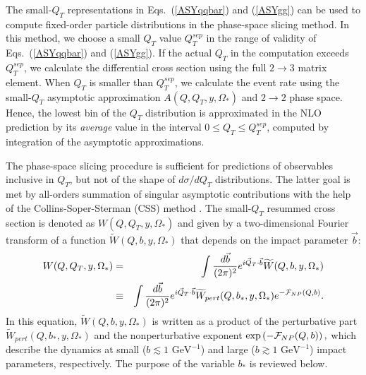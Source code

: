 \documentclass[12pt,english,aps,preprint,prd,letterpaper,fleqn,nofootinbib,showpacs,showkeys,tightenlines,floatfix]{revtex4}
\begin{document}
The small-$Q_{T}$ representations in Eqs.~(\ref{ASYqqbar}) and
(\ref{ASYgg}) can be used to compute fixed-order particle distributions
in the phase-space slicing method. In this method, we choose a small
$Q_{T}$ value $Q_{T}^{sep}$ in the range of validity of 
Eqs.~(\ref{ASYqqbar}) and (\ref{ASYgg}). If the
actual $Q_{T}$ in the computation exceeds $Q_{T}^{sep}$, we calculate
the differential cross section using the full $2\rightarrow3$ matrix
element. When $Q_{T}$ is smaller than $Q_{T}^{sep}$, we calculate
the event rate using the small-$Q_{T}$ asymptotic approximation $A(Q,Q_{T},y,\Omega_{*})$
and $2\rightarrow2$ phase space. Hence, the lowest bin of the $Q_{T}$
distribution is approximated in the NLO prediction by its \textit{average}
value in the interval $0\leq Q_{T}\leq Q_{T}^{sep}$, computed by
integration of the asymptotic approximations.

The phase-space slicing procedure is sufficient for predictions of
observables inclusive in $Q_{T}$, but not of the shape of $d\sigma/dQ_{T}$
distributions. The latter goal is met by all-orders summation of singular
asymptotic contributions with the help of the Collins-Soper-Sterman
(CSS) method \cite{Collins:1981va,Collins:1981uk,Collins:1984kg}.
The small-$Q_{T}$ resummed cross section is denoted as $W(Q,Q_{T},y,\Omega_{*})$
and given by a two-dimensional Fourier transform of a function $\widetilde{W}(Q,b,y,\Omega_{*})$
that depends on the impact parameter $\vec{b}$:\begin{eqnarray}
W(Q,Q_{T},y,\Omega_{*}) & = & \int\frac{d\vec{b}}{(2\pi)^{2}}e^{i\vec{Q}_{T}\cdot\vec{b}}\widetilde{W}(Q,b,y,\Omega_{*})\nonumber \\
 & \equiv & \int\frac{d\vec{b}}{(2\pi)^{2}}e^{i\vec{Q}_{T}\cdot\vec{b}}\widetilde{W}_{pert}(Q,b_{*},y,\Omega_{*})e^{-{\cal F}_{NP}(Q,b)}.\label{FourierIntegral}\end{eqnarray}
 In this equation, $\widetilde{W}(Q,b,y,\Omega_{*})$ is written
as a product of the perturbative part $\widetilde{W}_{pert}(Q,b_{*},y,\Omega_{*})$
and the nonperturbative exponent $\exp\left(-{\cal F}_{NP}(Q,b)\right),$
which describe the dynamics at small ($b\lesssim1\mbox{ GeV}^{-1}$)
and large ($b\gtrsim1\mbox{ GeV}^{-1}$) impact parameters, respectively. The purpose
of the variable $b_{*}$ is reviewed below.
\end{document}
